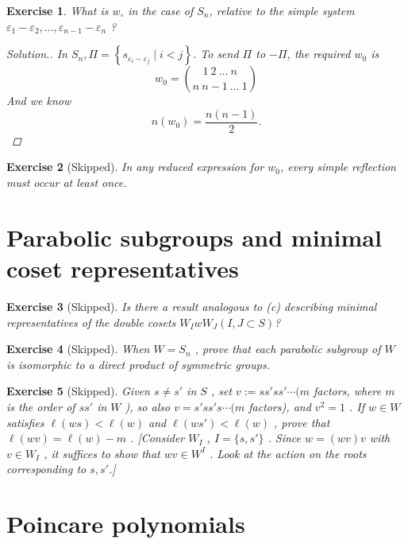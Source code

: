 \documentclass{article}
\theoremstyle{breakstyle}
\newtheorem{exercise}{Exercise}[section]
\newenvironment{solution}
  {\begin{proof}[Solution.]\renewcommand{\qedsymbol}{}}
  {\end{proof}}
\begin{document}
\begin{exercise}
What is $w_{\circ}$ in the case of $S_{n}$, relative to the simple system
$\varepsilon_{1} - \varepsilon_{2}, \ldots, \varepsilon_{n-1} - \varepsilon_{n}$
?

\begin{solution}
    In $S_{n},\Pi=\left\{ s_{\varepsilon_{i}-\varepsilon_{j}}\mid i<j \right\}
    $. To send $\Pi$ to $-\Pi$, the required $w_{0}$ is
    $$
    w_0=\binom{1\ 2\ \ldots \ n}{n\ n-1\ \ldots \ 1}
    $$
    And we know
    $$
    n(w_0)=\frac{n(n-1)}{2}
    .$$
\end{solution}

\end{exercise}

\begin{exercise}[Skipped]
In any reduced expression for $w_{0}$, every simple reflection must occur at
least once.
\end{exercise}

\setcounter{section}{9}
\section{Parabolic subgroups and minimal coset  representatives}

\begin{exercise}[Skipped]
Is there a result analogous to (c) describing minimal representatives of the
double cosets $W_{I}wW_{J}(I,J\subset S)$?
\end{exercise}

\begin{exercise}[Skipped]
When $W = S_{n}$ , prove that each parabolic subgroup of $W$ is isomorphic to a
direct product of symmetric groups.
\end{exercise}

\begin{exercise}[Skipped]
Given $s \neq s'$ in $S$ , set $v := ss'ss' \cdots (m$ factors, where $m$ is the
order of $ss'$ in $W$ ), so also $v = s'ss's \cdots (m$ factors), and $v^2 = 1$
. If $w \in W$ satisfies $\ell(ws) < \ell(w)$ and $\ell(ws') < \ell(w)$ , prove
that $\ell(wv) = \ell(w) - m$ . [Consider $W_I$ , $I = \{s, s'\}$ . Since $w =
(wv)v$ with $v \in W_I$ , it suffices to show that $wv \in W^I$ . Look at the
action on the roots corresponding to $s, s'$.]
\end{exercise}

\section{Poincare polynomials}
\end{document}
